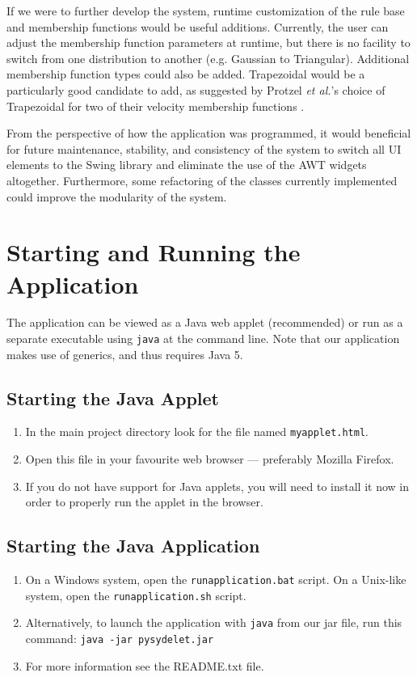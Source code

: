 \documentclass[12pt,letterpaper,oneside]{report}
\newcommand \java[1]{\texttt{#1}}
\newcommand \etal{\textit{et al.}}
\begin{document}
If we were to further develop the system, runtime customization of the rule
base and membership functions would be useful additions. Currently, the
user can adjust the membership function parameters at runtime, but there is no
facility to switch from one distribution to another (e.g. Gaussian to 
Triangular). Additional membership function types could also be added. Trapezoidal would be
a particularly good candidate to add, as suggested by Protzel \etal's choice 
of Trapezoidal for two of their velocity membership functions 
\cite{protzel-fuzzy}.

From the perspective of how the application was
programmed, it would beneficial for future maintenance, stability, 
and consistency of the system to switch all UI elements
to the Swing library and eliminate the use of the AWT widgets altogether. Furthermore,
some refactoring of the classes currently implemented could 
improve the modularity of the system.

\clearpage
\section{Starting and Running the Application}
The application can be viewed as a Java web applet (recommended) or 
run as a separate executable using \texttt{java} at the command line.
Note that our application makes use of generics, and thus requires Java 5.

\subsection{Starting the Java Applet}
\begin{enumerate}
  \item In the main project directory look for the file named \texttt{myapplet.html}.
  \item Open this file in your favourite web browser --- preferably Mozilla Firefox.
  \item If you do not have support for Java applets, you will need to install it now in order
    to properly run the applet in the browser.
\end{enumerate}

\subsection{Starting the Java Application}
\begin{enumerate}
  \item On a Windows system, open the \java{runapplication.bat} script. On a
      Unix-like system, open the \java{runapplication.sh} script.
  \item Alternatively, to launch the application with \java{java} from our jar
      file, run this command: \java{java -jar pysydelet.jar}
  \item For more information see the README.txt file.
\end{enumerate}
\end{document}
